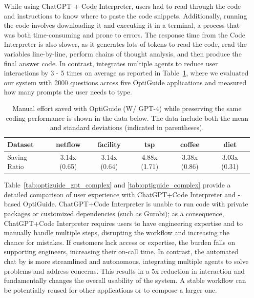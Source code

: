 While using ChatGPT + Code Interpreter, users had to read through the code and instructions to know where to paste the code snippets. Additionally, running the code involves downloading it and executing it in a terminal, a process that was both time-consuming and prone to errors. The response time from the Code Interpreter is also slower, as it generates lots of tokens to read the code, read the variables line-by-line, perform chains of thought analysis, and then produce the final answer code. In contrast, \libName integrates multiple agents to reduce user interactions by 3 - 5 times on average as reported in Table~\ref{tab:opti_improve}, where we evaluated our system with 2000 questions across five OptiGuide applications and measured how many prompts the user needs to type.

\begin{table}[h!]
    \centering
     \caption{Manual effort saved with OptiGuide (W/ GPT-4) while preserving the same coding performance is shown in the data below. The data include both the mean and standard deviations (indicated in parentheses).}
    \begin{tabular}{l|ccccc}
    \toprule
Dataset & netflow  & facility & tsp & coffee & diet \\
\midrule
Saving Ratio &  3.14x (0.65) &  3.14x (0.64) & 4.88x (1.71) &  3.38x (0.86) & 3.03x (0.31)\\
\bottomrule
    \end{tabular}
    \label{tab:opti_improve}
\end{table}

Table~\ref{tab:optiguide_gpt_complex} and \ref{tab:optiguide_complex} provide a detailed comparison of user experience with ChatGPT+Code Interpreter and \libName-based OptiGuide. ChatGPT+Code Interpreter is unable to run code with private packages or customized dependencies (such as Gurobi); as a consequence, ChatGPT+Code Interpreter requires users to have engineering expertise and to manually handle multiple steps, disrupting the workflow and increasing the chance for mistakes. If customers lack access or expertise, the burden falls on supporting engineers, increasing their on-call time. In contrast, the automated chat by \libName is more streamlined and autonomous, integrating multiple agents to solve problems and address concerns. This results in a 5x reduction in interaction and fundamentally changes the overall usability of the system. A stable workflow can be potentially reused for other applications or to compose a larger one.


